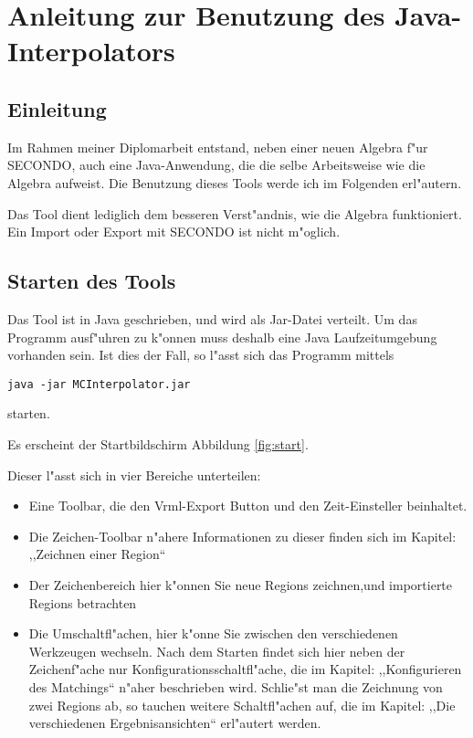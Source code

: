 
\chapter{Anleitung zur Benutzung des Java-Interpolators}\label{Handbuch}
\minitoc
\newpage
\section{Einleitung}
Im Rahmen meiner Diplomarbeit entstand, neben einer neuen Algebra f"ur SECONDO, auch eine Java-Anwendung, die die selbe Arbeitsweise wie die Algebra aufweist. Die Benutzung dieses Tools werde ich im Folgenden erl"autern.

Das Tool dient lediglich dem besseren Verst"andnis, wie die Algebra funktioniert. Ein Import oder Export mit SECONDO ist nicht m"oglich.
\section{Starten des Tools}
Das Tool ist in Java geschrieben, und wird als Jar-Datei verteilt. Um das Programm ausf"uhren zu k"onnen muss deshalb eine Java Laufzeitumgebung vorhanden sein. Ist dies der Fall, so l"asst sich das Programm mittels \begin{verbatim}
java -jar MCInterpolator.jar
\end{verbatim}  starten.

Es erscheint der Startbildschirm Abbildung \ref{fig:start}.

Dieser l"asst sich in vier Bereiche unterteilen:
\begin{itemize}
\item Eine Toolbar, die den Vrml-Export Button und den Zeit-Einsteller beinhaltet. 
\item Die Zeichen-Toolbar n"ahere Informationen zu dieser finden sich im Kapitel: ,,Zeichnen einer Region``
\item Der Zeichenbereich hier k"onnen Sie neue Regions zeichnen,und importierte Regions betrachten
\item Die Umschaltfl"achen, hier k"onne Sie zwischen den verschiedenen Werkzeugen wechseln. Nach dem Starten findet sich hier neben der Zeichenf"ache nur Konfigurationsschaltfl"ache, die im Kapitel: ,,Konfigurieren des Matchings`` n"aher beschrieben wird. Schlie"st man die Zeichnung von zwei Regions ab, so tauchen weitere Schaltfl"achen auf, die im Kapitel: ,,Die verschiedenen Ergebnisansichten`` erl"autert werden.
\end{itemize} 

